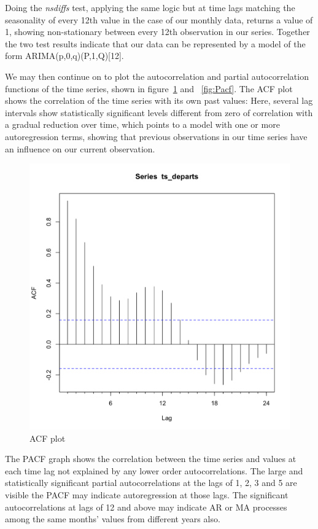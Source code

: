 \documentclass[conference]{IEEEtran}
\begin{document}
Doing the \textit{nsdiffs} test, applying the same logic but at time lags matching the seasonality of every 12th value in the case of our monthly data, returns a value of 1, showing non-stationary between every 12th observation in our series.  Together the two test results indicate that our data can be represented by a model of the form ARIMA(p,0,q)(P,1,Q)[12]. 

We may then continue on to plot the autocorrelation and partial autocorrelation functions of the time series, shown in figure~\ref{fig:Acf} and ~\ref{fig:Pacf}.  The ACF plot shows the correlation of the time series with its own past values: Here, several lag intervals show statistically significant levels different from zero of correlation with a gradual reduction over time, which points to a model with one or more autoregression terms, showing that previous observations in our time series have an influence on our current observation.  

\begin{figure}[htbp]
\centerline{\includegraphics[scale=0.25]{Acf.png}}
\caption{ACF plot}
\label{fig:Acf}
\end{figure}

The PACF graph shows the correlation between the time series and values at each time lag not explained by any lower order autocorrelations.  The large and statistically significant partial autocorrelations at the lags of 1, 2, 3 and 5 are visible the PACF may indicate autoregression at those lags.  The significant autocorrelations at lags of 12 and above may indicate AR or MA processes among the same months' values from different years also.  
\end{document}
